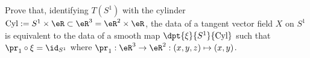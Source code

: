 \begin{exercice}\label{exo006}

  Prove that, identifying $T(S^1)$ with the cylinder $\text{Cyl}:=S^1\times\eR\subset\eR^3=\eR^2\times\eR$, 
the data of a tangent vector field $X$ on $S^1$ is equivalent to the data of a smooth map $\dpt{ \xi }{ S^1 }{ \text{Cyl} }$
such that $\pr_1\circ\xi=\id_{S^1}$ 
where $\pr_1:\eR^3\to\eR^2:(x,y,z)\mapsto(x,y)$.

\end{exercice}

